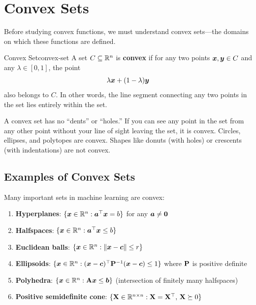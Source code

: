 \documentclass[../../main.tex]{subfiles}
\begin{document}
\section{Convex Sets}
\label{sec:convex-sets}

Before studying convex functions, we must understand convex sets---the domains on which these functions are defined.

\begin{definition}{Convex Set}{convex-set}
A set $C \subseteq \mathbb{R}^n$ is \textbf{convex} if for any two points $\boldsymbol{x}, \boldsymbol{y} \in C$ and any $\lambda \in [0, 1]$, the point
\[
    \lambda \boldsymbol{x} + (1 - \lambda) \boldsymbol{y}
\]
also belongs to $C$. In other words, the line segment connecting any two points in the set lies entirely within the set.
\end{definition}

\begin{intuition}
A convex set has no ``dents'' or ``holes.'' If you can see any point in the set from any other point without your line of sight leaving the set, it is convex. Circles, ellipses, and polytopes are convex. Shapes like donuts (with holes) or crescents (with indentations) are not convex.
\end{intuition}

\subsection{Examples of Convex Sets}

Many important sets in machine learning are convex:

\begin{enumerate}
    \item \textbf{Hyperplanes}: $\{\boldsymbol{x} \in \mathbb{R}^n : \boldsymbol{a}^\top \boldsymbol{x} = b\}$ for any $\boldsymbol{a} \neq \boldsymbol{0}$

    \item \textbf{Halfspaces}: $\{\boldsymbol{x} \in \mathbb{R}^n : \boldsymbol{a}^\top \boldsymbol{x} \leq b\}$

    \item \textbf{Euclidean balls}: $\{\boldsymbol{x} \in \mathbb{R}^n : \left\lVert \boldsymbol{x} - \boldsymbol{c} \right\rVert \leq r\}$

    \item \textbf{Ellipsoids}: $\{\boldsymbol{x} \in \mathbb{R}^n : (\boldsymbol{x} - \boldsymbol{c})^\top \mathbf{P}^{-1} (\boldsymbol{x} - \boldsymbol{c}) \leq 1\}$ where $\mathbf{P}$ is positive definite

    \item \textbf{Polyhedra}: $\{\boldsymbol{x} \in \mathbb{R}^n : \mathbf{A}\boldsymbol{x} \leq \boldsymbol{b}\}$ (intersection of finitely many halfspaces)

    \item \textbf{Positive semidefinite cone}: $\{\mathbf{X} \in \mathbb{R}^{n \times n} : \mathbf{X} = \mathbf{X}^\top,\, \mathbf{X} \succeq 0\}$
\end{enumerate}
\end{document}

